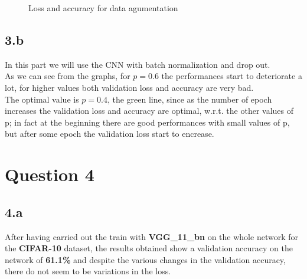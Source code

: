 \documentclass{article}
\begin{document}
\begin{figure}[!h]
	\begin{center}
		\hspace{1mm}
	\end{center}
	\caption{Loss and accuracy for data agumentation}
	\label{gr}
\end{figure}

\newpage
\subsection*{3.b}
In this part we will use the CNN with batch normalization and drop out. \\
As we can see from the graphs, for $ p = 0.6 $ the performances start to deteriorate a lot, for higher values both validation loss and accuracy are very bad.\\
The optimal value is $p=0.4$, the green line, since as the number of epoch increases the validation loss and accuracy are optimal, w.r.t. the other values of p; in fact at the beginning there are good performances with small values of p, but after some epoch the validation loss start to encrease.\\
\begin{figure}[!h]
	\begin{center}
		\hspace{1mm}
		\hspace{1mm}
	\end{center}
	\captionsetup{justification=raggedright,margin=1cm}
	\label{gr}
\end{figure}





\newpage

\section{Question 4}


\subsection*{4.a}
After having carried out the train with \textbf{VGG\_11\_bn} on the whole network for the \textbf{CIFAR-10} dataset, the results obtained show a validation accuracy on the network of \textbf{61.1\%} and despite the various changes in the validation accuracy, there do not seem to be variations in the loss.
\end{document}
